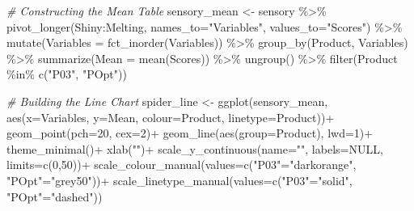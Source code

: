 \documentclass[
]{book}
\newenvironment{Shaded}{\begin{snugshade}}{\end{snugshade}}
\newcommand{\AttributeTok}[1]{\textcolor[rgb]{0.77,0.63,0.00}{#1}}
\newcommand{\CommentTok}[1]{\textcolor[rgb]{0.56,0.35,0.01}{\textit{#1}}}
\newcommand{\ConstantTok}[1]{\textcolor[rgb]{0.00,0.00,0.00}{#1}}
\newcommand{\DecValTok}[1]{\textcolor[rgb]{0.00,0.00,0.81}{#1}}
\newcommand{\FunctionTok}[1]{\textcolor[rgb]{0.00,0.00,0.00}{#1}}
\newcommand{\NormalTok}[1]{#1}
\newcommand{\OtherTok}[1]{\textcolor[rgb]{0.56,0.35,0.01}{#1}}
\newcommand{\SpecialCharTok}[1]{\textcolor[rgb]{0.00,0.00,0.00}{#1}}
\newcommand{\StringTok}[1]{\textcolor[rgb]{0.31,0.60,0.02}{#1}}
\begin{document}
\begin{Shaded}
\begin{Highlighting}[]
\CommentTok{\# Constructing the Mean Table}
\NormalTok{sensory\_mean }\OtherTok{\textless{}{-}}\NormalTok{ sensory }\SpecialCharTok{\%\textgreater{}\%} 
  \FunctionTok{pivot\_longer}\NormalTok{(Shiny}\SpecialCharTok{:}\NormalTok{Melting, }\AttributeTok{names\_to=}\StringTok{"Variables"}\NormalTok{, }\AttributeTok{values\_to=}\StringTok{"Scores"}\NormalTok{) }\SpecialCharTok{\%\textgreater{}\%} 
  \FunctionTok{mutate}\NormalTok{(}\AttributeTok{Variables =} \FunctionTok{fct\_inorder}\NormalTok{(Variables)) }\SpecialCharTok{\%\textgreater{}\%} 
  \FunctionTok{group\_by}\NormalTok{(Product, Variables) }\SpecialCharTok{\%\textgreater{}\%} 
  \FunctionTok{summarize}\NormalTok{(}\AttributeTok{Mean =} \FunctionTok{mean}\NormalTok{(Scores)) }\SpecialCharTok{\%\textgreater{}\%} 
  \FunctionTok{ungroup}\NormalTok{() }\SpecialCharTok{\%\textgreater{}\%} 
  \FunctionTok{filter}\NormalTok{(Product }\SpecialCharTok{\%in\%} \FunctionTok{c}\NormalTok{(}\StringTok{"P03"}\NormalTok{, }\StringTok{"POpt"}\NormalTok{))}

\CommentTok{\# Building the Line Chart}
\NormalTok{spider\_line }\OtherTok{\textless{}{-}} \FunctionTok{ggplot}\NormalTok{(sensory\_mean, }\FunctionTok{aes}\NormalTok{(}\AttributeTok{x=}\NormalTok{Variables, }\AttributeTok{y=}\NormalTok{Mean, }\AttributeTok{colour=}\NormalTok{Product, }\AttributeTok{linetype=}\NormalTok{Product))}\SpecialCharTok{+}
  \FunctionTok{geom\_point}\NormalTok{(}\AttributeTok{pch=}\DecValTok{20}\NormalTok{, }\AttributeTok{cex=}\DecValTok{2}\NormalTok{)}\SpecialCharTok{+}
  \FunctionTok{geom\_line}\NormalTok{(}\FunctionTok{aes}\NormalTok{(}\AttributeTok{group=}\NormalTok{Product), }\AttributeTok{lwd=}\DecValTok{1}\NormalTok{)}\SpecialCharTok{+}
  \FunctionTok{theme\_minimal}\NormalTok{()}\SpecialCharTok{+}
  \FunctionTok{xlab}\NormalTok{(}\StringTok{""}\NormalTok{)}\SpecialCharTok{+}
  \FunctionTok{scale\_y\_continuous}\NormalTok{(}\AttributeTok{name=}\StringTok{""}\NormalTok{, }\AttributeTok{labels=}\ConstantTok{NULL}\NormalTok{, }\AttributeTok{limits=}\FunctionTok{c}\NormalTok{(}\DecValTok{0}\NormalTok{,}\DecValTok{50}\NormalTok{))}\SpecialCharTok{+}
  \FunctionTok{scale\_colour\_manual}\NormalTok{(}\AttributeTok{values=}\FunctionTok{c}\NormalTok{(}\StringTok{"P03"}\OtherTok{=}\StringTok{"darkorange"}\NormalTok{, }\StringTok{"POpt"}\OtherTok{=}\StringTok{"grey50"}\NormalTok{))}\SpecialCharTok{+}
  \FunctionTok{scale\_linetype\_manual}\NormalTok{(}\AttributeTok{values=}\FunctionTok{c}\NormalTok{(}\StringTok{"P03"}\OtherTok{=}\StringTok{"solid"}\NormalTok{, }\StringTok{"POpt"}\OtherTok{=}\StringTok{"dashed"}\NormalTok{))}
\end{Highlighting}
\end{Shaded}
\end{document}
